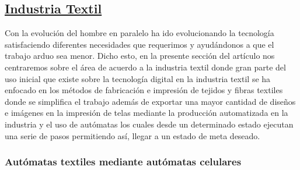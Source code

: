 \documentclass[10pt,conference]{IEEEtran}
\begin{document}
\subsection{\underline{\textbf{Industria Textil}}}

Con la evolución del hombre en paralelo ha ido evolucionando la tecnología satisfaciendo diferentes necesidades que requerimos y ayudándonos a que el trabajo arduo sea menor. Dicho esto, en la presente sección del artículo nos centraremos sobre el área de acuerdo a la industria textil donde gran parte del uso inicial que existe sobre la tecnología digital en la industria textil se ha enfocado en los métodos de fabricación e impresión de tejidos y fibras textiles donde se simplifica el trabajo además de exportar una mayor cantidad de diseños e imágenes en la impresión de telas mediante la producción automatizada en la industria y el uso de autómatas los cuales desde un determinado estado ejecutan una serie de pasos permitiendo así, llegar a un estado de meta deseado.

\vspace{2.5mm}
\subsubsection{\textbf{Autómatas textiles mediante autómatas celulares}}
\end{document}

